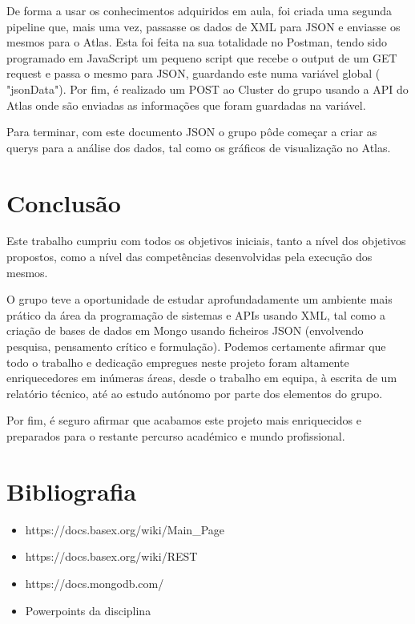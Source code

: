 \documentclass{article}
\begin{document}
De forma a usar os conhecimentos adquiridos em aula, foi criada uma segunda pipeline que, mais uma vez, passasse os dados de XML para JSON e enviasse os mesmos para o Atlas. Esta foi feita na sua totalidade no Postman, tendo sido programado em JavaScript um pequeno script que recebe o output de um GET request e passa o mesmo para JSON, guardando este numa variável global ( "jsonData").  Por fim, é realizado um POST ao Cluster do grupo usando a API do Atlas onde são enviadas as informações que foram guardadas na variável.\par
Para terminar, com este documento JSON o grupo pôde começar a criar as querys para a análise dos dados, tal como os gráficos de visualização no Atlas.


\newpage
\section{Conclusão}
\hspace{0.5cm} Este trabalho cumpriu com todos os objetivos iniciais, tanto a nível dos objetivos propostos, como a nível das competências desenvolvidas pela execução dos mesmos. \par
O grupo teve a oportunidade de estudar aprofundadamente um ambiente mais prático da área da programação de sistemas e APIs usando XML, tal como a criação de bases de dados em Mongo usando ficheiros JSON (envolvendo pesquisa, pensamento crítico e formulação).
Podemos certamente afirmar que todo o trabalho e dedicação empregues neste projeto foram altamente enriquecedores em inúmeras áreas, desde o trabalho em equipa, à escrita de um relatório técnico, até ao estudo autónomo por parte dos elementos do grupo. \par
Por fim, é seguro afirmar que acabamos este projeto mais enriquecidos e preparados para o restante percurso académico e mundo profissional. \par

\section{Bibliografia}
\begin{itemize}
    \item https://docs.basex.org/wiki/Main\_Page
    \item https://docs.basex.org/wiki/REST
    \item https://docs.mongodb.com/
    \item Powerpoints da disciplina
\end{itemize}
\end{document}
